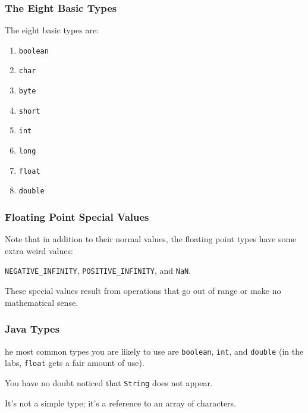 \begin{frame}
\frametitle{The Eight Basic Types}
\begin{changemargin}{1cm}

The eight basic types are:

\begin{enumerate}
\item \texttt{boolean}
\item \texttt{char}
\item \texttt{byte}
\item \texttt{short}
\item \texttt{int}
\item \texttt{long}
\item \texttt{float}
\item \texttt{double}
\end{enumerate}


\end{changemargin}
\end{frame}

\begin{frame}
\frametitle{Floating Point Special Values}
\begin{changemargin}{1cm}

Note that in addition to their normal values, the floating point types have some extra weird values: 

\texttt{NEGATIVE\_INFINITY}, \texttt{POSITIVE\_INFINITY}, and \texttt{NaN}.

These special values result from operations that go out of range or make no mathematical sense.

\end{changemargin}
\end{frame}

\begin{frame}
\frametitle{Java Types}
\begin{changemargin}{1cm}

he most common types you are likely to use are \texttt{boolean}, \texttt{int}, and \texttt{double} (in the labs, \texttt{float} gets a fair amount of use).

You have no doubt noticed that \texttt{String} does not appear.

It's not a simple type; it's a reference to an array of characters.

\end{changemargin}
\end{frame}

